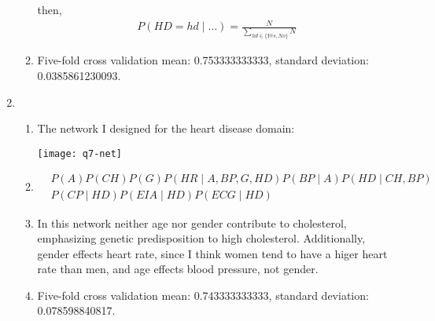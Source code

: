 \documentclass[12pt]{article}
\begin{document}
\begin{enumerate}
\begin{enumerate}
then,
\begin{align*}
P(HD=hd\mid \ldots) = \frac{N}{\sum_{hd\in\{Yes,No\}}N}
\end{align*}

\item
Five-fold cross validation mean: 0.753333333333, standard deviation: 0.0385861230093.

\end{enumerate}

\item %
\begin{enumerate}
\item
The network I designed for the heart disease domain:
\begin{center}
\texttt{[image: q7-net]}
\end{center}

\item
\begin{align*}
&P(A)P(CH)P(G)P(HR\mid A,BP,G,HD)P(BP\mid A)P(HD\mid CH,BP)\\
&P(CP\mid HD)P(EIA\mid HD)P(ECG\mid HD)
\end{align*}

\item
In this network neither age nor gender contribute to cholesterol, emphasizing genetic predisposition to high cholesterol. Additionally, gender effects heart rate, since I think women tend to have a higer heart rate than men, and age effects blood pressure, not gender.

\item
Five-fold cross validation mean: 0.743333333333, standard deviation: 0.078598840817.

\end{enumerate}

\end{enumerate}
\end{document}
